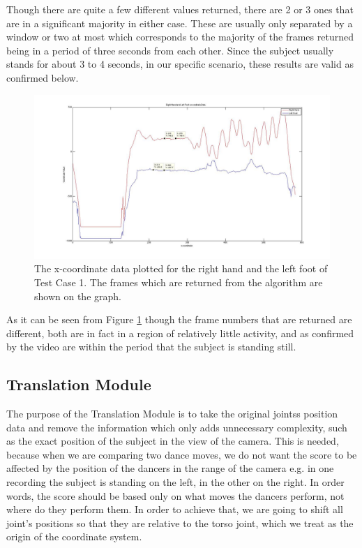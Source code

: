 \documentclass[10pt,a4paper]{article}
\begin{document}
\noindent
Though there are quite a few different values returned, there are 2 or 3 ones that are in a significant majority in either case. These are usually only separated by a window or two at most which corresponds to the majority of the frames returned being in a period of three seconds from each other. Since the subject usually stands for about 3 to 4 seconds, in our specific scenario, these results are valid as confirmed below.
\begin{figure}[h]
\center
\includegraphics[scale=0.2]{Motionless_R_Hand_L_Foot_X.jpg} 
\caption{The x-coordinate data plotted for the right hand and the left foot of Test Case 1. The frames which are returned from the algorithm are shown on the graph.}
\label{motionless_rh_lf}
\end{figure}
 
\noindent
As it can be seen from Figure \ref{motionless_rh_lf} though the frame numbers that are returned are different, both are in fact in a region of relatively little activity, and as confirmed by the video are within the period that the subject is standing still. 

\clearpage
\subsection{Translation Module}
\noindent
The purpose of the Translation Module is to take the original jointss position data and remove the information which only adds unnecessary complexity, such as the exact position of the subject in the view of the camera. This is needed, because when we are comparing two dance moves, we do not want the score to be affected by the position of the dancers in the range of the camera e.g. in one recording the subject is standing on the left, in the other on the right. In order words, the score should be based only on what moves the dancers perform, not where do they perform them. In order to achieve that, we are going to shift all joint's positions so that they are relative to the torso joint, which we treat as the origin of the coordinate system.
\end{document}

